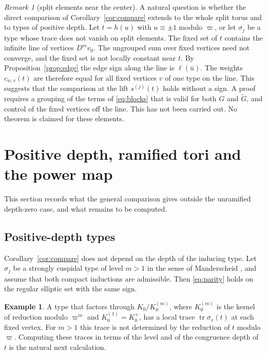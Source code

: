 \documentclass[12pt,letterpaper]{article}
\numberwithin{equation}{section}
\theoremstyle{definition}
\newtheorem{example}[theorem]{Example}
\theoremstyle{remark}
\newtheorem{remarkyr}{Remark}
\newcommand{\Mp}{\widetilde G}
\newcommand{\tr}{\operatorname{tr}}
\begin{document}
\begin{remarkyr}[split elements near the center]\label{rem:split}
A natural question is whether the direct comparison of Corollary~\ref{cor:compare} extends to the whole split torus and to types of positive depth. Let $t=h(u)$ with $u\equiv\pm1$ modulo $\varpi$, or let $\sigma_j$ be a type whose trace does not vanish on split elements. The fixed set of $t$ contains the infinite line of vertices $D^mv_0$. The ungrouped sum over fixed vertices need not converge, and the fixed set is not locally constant near $t$. By Proposition~\ref{prop:edge} the edge sign along the line is $\ell(\bar u)$. The weights $c_{w,v}(t)$ are therefore equal for all fixed vertices $v$ of one type on the line. This suggests that the comparison at the lift $s^{(j)}(t)$ holds without a sign. A proof requires a grouping of the terms of \eqref{eq:blocks} that is valid for both $G$ and $\Mp$, and control of the fixed vertices off the line. This has not been carried out. No theorem is claimed for these elements.
\end{remarkyr}

\section{Positive depth, ramified tori and the power map}\label{sec:extensions}
This section records what the general comparison gives outside the unramified depth-zero case, and what remains to be computed.

\subsection{Positive-depth types}
Corollary~\ref{cor:compare} does not depend on the depth of the inducing type. Let $\sigma_j$ be a strongly cuspidal type of level $m>1$ in the sense of Manderscheid \cite{Ma84a,Ma84b}, and assume that both compact inductions are admissible. Then \eqref{eq:parity} holds on the regular elliptic set with the same sign.

\begin{example}
A type that factors through $K_0/K_0^{(m)}$, where $K_0^{(m)}$ is the kernel of reduction modulo $\varpi^m$ and $K_0^{(1)}=K_0^+$, has a local trace $\tr\sigma_v(t)$ at each fixed vertex. For $m>1$ this trace is not determined by the reduction of $t$ modulo $\varpi$. Computing these traces in terms of the level and of the congruence depth of $t$ is the natural next calculation.
\end{example}
\end{document}
